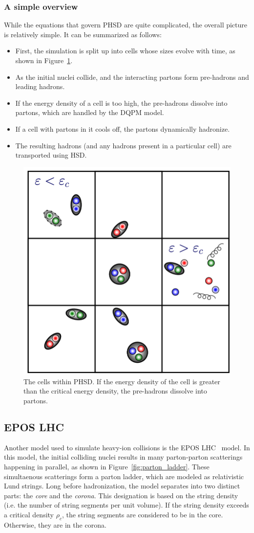 \subsubsection{A simple overview}
While the equations that govern PHSD are quite complicated, the overall picture is relatively simple. It can be summarized as follows:
\begin{itemize}
    \item First, the simulation is split up into cells whose sizes evolve with time, as shown in Figure~\ref{fig:phsd_cells}.
    \item As the initial nuclei collide, and the interacting partons form pre-hadrons and leading hadrons.
    \item If the energy density of a cell is too high, the pre-hadrons dissolve into partons, which are handled by the DQPM model.
    \item If a cell with partons in it cools off, the partons dynamically hadronize.
    \item The resulting hadrons (and any hadrons present in a particular cell) are transported using HSD.
\end{itemize}

\begin{figure}
    \centering
    \includegraphics[width=0.5\linewidth]{figures/introduction/phsd_cells.png}
    \caption{The cells within PHSD. If the energy density of the cell is greater than the critical energy density, the pre-hadrons dissolve into partons.}
    \label{fig:phsd_cells}
\end{figure}

\subsection{EPOS LHC}

Another model used to simulate heavy-ion collisions is the EPOS LHC~\cite{EPOSLHC} model. In this model, the initial colliding nuclei results in many parton-parton scatterings happening in parallel, as shown in Figure~\ref{fig:parton_ladder}. These simultaenous scatterings form a parton ladder, which are modeled as relativistic Lund strings. Long before hadronization, the model separates into two distinct parts: the \textit{core} and the \textit{corona}. This designation is based on the string density (i.e. the number of string segments per unit volume). If the string density exceeds a critical density $\rho_c$, the string segments are considered to be in the core. Otherwise, they are in the corona. 


